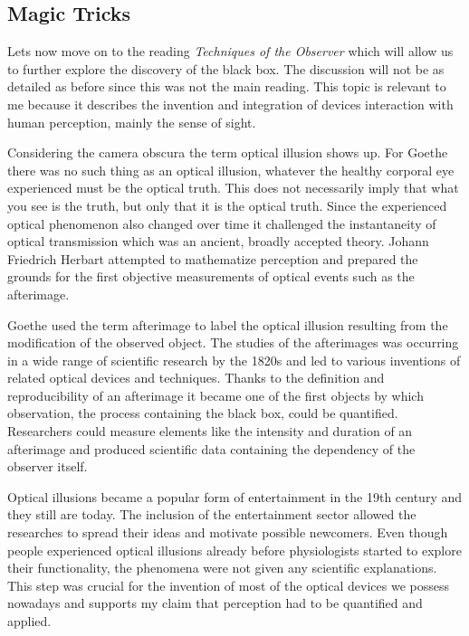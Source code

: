 \documentclass[12pt,a4paper]{article}
\begin{document}
\subsection*{Magic Tricks}

Lets now move on to the reading {\it{Techniques of the Observer}} \cite{crary} which will allow us
to further explore the discovery of the black box. The discussion will not be as detailed as before
since this was not the main reading. This topic is relevant to me because it describes the invention and
integration of devices interaction with human perception, mainly the sense of sight.

Considering the camera obscura the term optical illusion shows up. For Goethe there was no such
thing as an optical illusion, whatever the healthy corporal eye experienced must be the optical truth.
This does not necessarily imply that what you see is the truth, but only that it is the optical truth.
Since the experienced optical phenomenon also changed over time it challenged the instantaneity
of optical transmission which was an ancient, broadly accepted theory.
Johann Friedrich Herbart attempted to mathematize perception and prepared the grounds for the
first objective measurements of optical events such as the afterimage.

Goethe used the term afterimage to label the optical illusion resulting from the modification of the
observed object.
The studies of the afterimages was occurring in a wide range of scientific research by the
1820s and led to various inventions of related optical devices and techniques.
Thanks to the definition and reproducibility of an afterimage it became one of the first
objects by which observation, the process containing the black box, could be quantified.
Researchers could measure elements like the intensity and duration of an afterimage and produced
scientific data containing the dependency of the observer itself.

Optical illusions became a popular form of entertainment in the 19th century and they still are today.
The inclusion of the entertainment sector allowed the researches to spread their ideas and
motivate possible newcomers. Even though people experienced optical illusions already before
physiologists started to explore their functionality, the phenomena were not given any scientific
explanations. This step was crucial for the invention of most of the optical devices we possess nowadays
and supports my claim that perception had to be quantified and applied.
\end{document}
